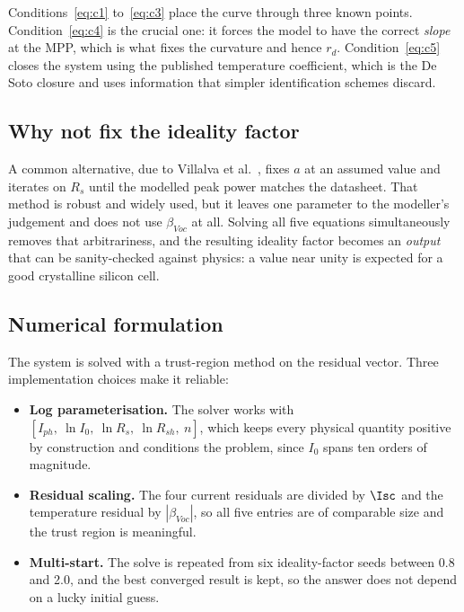 Conditions~\eqref{eq:c1} to~\eqref{eq:c3} place the curve through three known
points. Condition~\eqref{eq:c4} is the crucial one: it forces the model to have
the correct \emph{slope} at the MPP, which is what fixes the curvature and hence
$r_d$. Condition~\eqref{eq:c5} closes the system using the published temperature
coefficient, which is the De Soto closure and uses information that simpler
identification schemes discard.

\subsection{Why not fix the ideality factor}

A common alternative, due to Villalva et al.~\cite{villalva}, fixes $a$ at an
assumed value and iterates on $R_s$ until the modelled peak power matches the
datasheet. That method is robust and widely used, but it leaves one parameter to
the modeller's judgement and does not use $\beta_{Voc}$ at all. Solving all five
equations simultaneously removes that arbitrariness, and the resulting ideality
factor becomes an \emph{output} that can be sanity-checked against physics: a
value near unity is expected for a good crystalline silicon cell.

\subsection{Numerical formulation}

The system is solved with a trust-region method on the residual vector. Three
implementation choices make it reliable:

\begin{itemize}[leftmargin=1.4em]
  \item \textbf{Log parameterisation.} The solver works with
        $\left[I_{ph},\ \ln I_0,\ \ln R_s,\ \ln R_{sh},\ n\right]$, which keeps
        every physical quantity positive by construction and conditions the
        problem, since $I_0$ spans ten orders of magnitude.
  \item \textbf{Residual scaling.} The four current residuals are divided by
        $\Isc$ and the temperature residual by $|\beta_{Voc}|$, so all five
        entries are of comparable size and the trust region is meaningful.
  \item \textbf{Multi-start.} The solve is repeated from six ideality-factor
        seeds between \num{0.8} and \num{2.0}, and the best converged result is
        kept, so the answer does not depend on a lucky initial guess.
\end{itemize}

